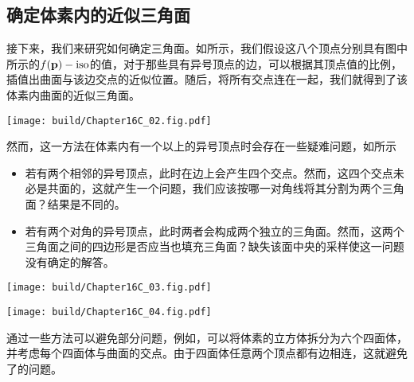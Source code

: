 \subsection{确定体素内的近似三角面}
接下来，我们来研究如何确定三角面。如所示，我们假设这八个顶点分别具有图中所示的$f(\vb{p})-\mathrm{iso}$的值，对于那些具有异号顶点的边，可以根据其顶点值的比例，插值出曲面与该边交点的近似位置。随后，将所有交点连在一起，我们就得到了该体素内曲面的近似三角面。
\begin{Figure}[确定体素内的近似三角面]
    \texttt{[image: build/Chapter16C\_02.fig.pdf]}
\end{Figure}
然而，这一方法在体素内有一个以上的异号顶点时会存在一些疑难问题，如所示
\begin{itemize}
    \item 若有两个相邻的异号顶点，此时在边上会产生四个交点。然而，这四个交点未必是共面的，这就产生一个问题，我们应该按哪一对角线将其分割为两个三角面？结果是不同的。
    \item 若有两个对角的异号顶点，此时两者会构成两个独立的三角面。然而，这两个三角面之间的四边形是否应当也填充三角面？缺失该面中央的采样使这一问题没有确定的解答。
\end{itemize}
\begin{Figure}[确定体素内的近似三角面的疑难问题]
    \begin{FigureSub}[两个相邻的顶点]
        \texttt{[image: build/Chapter16C\_03.fig.pdf]}
    \end{FigureSub}\hspace{0.75cm}
    \begin{FigureSub}[两个对角的顶点]
        \texttt{[image: build/Chapter16C\_04.fig.pdf]}
    \end{FigureSub}
\end{Figure}
通过一些方法可以避免部分问题，例如，可以将体素的立方体拆分为六个四面体，并考虑每个四面体与曲面的交点。由于四面体任意两个顶点都有边相连，这就避免了的问题。


